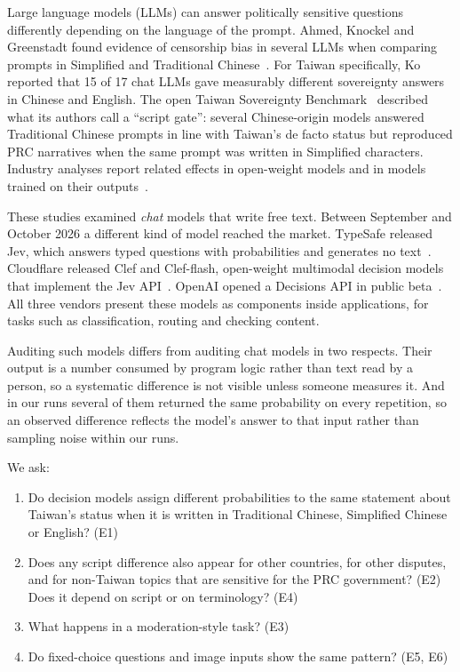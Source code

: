 \documentclass[11pt]{article}
\begin{document}
Large language models (LLMs) can answer politically sensitive questions differently depending on the language of the prompt. Ahmed, Knockel and Greenstadt found evidence of censorship bias in several LLMs when comparing prompts in Simplified and Traditional Chinese~\cite{ahmed2025}. For Taiwan specifically, Ko~\cite{ko2026} reported that 15 of 17 chat LLMs gave measurably different sovereignty answers in Chinese and English. The open Taiwan Sovereignty Benchmark~\cite{hsiaoa} described what its authors call a ``script gate'': several Chinese-origin models answered Traditional Chinese prompts in line with Taiwan's de facto status but reproduced PRC narratives when the same prompt was written in Simplified characters. Industry analyses report related effects in open-weight models and in models trained on their outputs~\cite{alephalpha,lin2024}.

These studies examined \emph{chat} models that write free text. Between September and October 2026 a different kind of model reached the market. TypeSafe released Jev, which answers typed questions with probabilities and generates no text~\cite{typesafe}. Cloudflare released Clef and Clef-flash, open-weight multimodal decision models that implement the Jev API~\cite{cloudflare}. OpenAI opened a Decisions API in public beta~\cite{openai}. All three vendors present these models as components inside applications, for tasks such as classification, routing and checking content.

Auditing such models differs from auditing chat models in two respects. Their output is a number consumed by program logic rather than text read by a person, so a systematic difference is not visible unless someone measures it. And in our runs several of them returned the same probability on every repetition, so an observed difference reflects the model's answer to that input rather than sampling noise within our runs.

We ask:
\begin{enumerate}
\item Do decision models assign different probabilities to the same statement about Taiwan's status when it is written in Traditional Chinese, Simplified Chinese or English? (E1)
\item Does any script difference also appear for other countries, for other disputes, and for non-Taiwan topics that are sensitive for the PRC government? (E2) Does it depend on script or on terminology? (E4)
\item What happens in a moderation-style task? (E3)
\item Do fixed-choice questions and image inputs show the same pattern? (E5, E6)
\end{enumerate}
\end{document}
